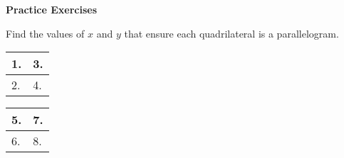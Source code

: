 \def\figdir{/storage/emulated/0/Documents/documents/latex/1920/Grade-8/3rd/proving-parallelograms/f}
\def\lenA{1.3in}

\textbf{Practice Exercises}

\vspce

Find the values of $x$ and $y$ that ensure each quadrilateral is a parallelogram. 

\begin{center}

\noindent\begin{minipage}{\textwidth}
\begin{tabularx}{\textwidth}{|X|X|}
\hline
1. 
& 
3. \\
\hline
2. 
& 
4. \\
\hline
\end{tabularx} 
\end{minipage}
\end{center} 

\newpage 

\begin{center}
\noindent\begin{minipage}{\textwidth}
\begin{tabularx}{\textwidth}{|X|X|}
\hline 
5. 
& 
7. \\
\hline
6. 
& 
8. \\
\hline
\end{tabularx} 
\end{minipage}
\end{center} 
 
